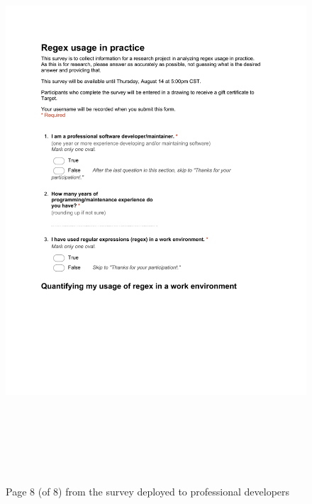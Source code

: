 \begin{figure}[!htbp]
   \centering
       \includegraphics[page=8, height=21cm,keepaspectratio]{nontex/appendix/regexUsageInPracticeSurvey}
 \caption{Page 8 (of 8) from the survey deployed to professional developers}
 \label{fig:surveyPDF8}
\end{figure}

\afterpage{\clearpage}







% 

% 

% 

% 

% 

% 



% 

% 
\afterpage{\clearpage}

